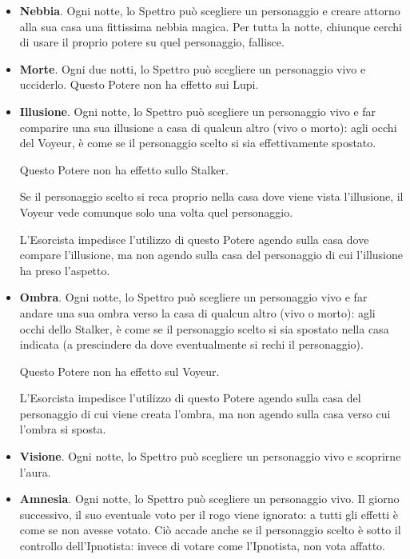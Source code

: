 \documentclass[a4paper,10pt]{article}
\begin{document}
\begin{itemize}
 \item {\bf Nebbia}. Ogni notte, lo Spettro può scegliere un personaggio e creare attorno alla sua casa una fittissima nebbia magica. Per tutta la notte, chiunque cerchi di usare il proprio potere su quel personaggio, fallisce.
 
 \item {\bf Morte}. Ogni due notti, lo Spettro può scegliere un personaggio vivo e ucciderlo. Questo Potere non ha effetto sui Lupi.
 
 \item {\bf Illusione}. Ogni notte, lo Spettro può scegliere un personaggio vivo e far comparire una sua illusione a casa di qualcun altro (vivo o morto): agli occhi del Voyeur, è come se il personaggio scelto si sia effettivamente spostato.
 
 Questo Potere non ha effetto sullo Stalker.

 Se il personaggio scelto si reca proprio nella casa dove viene vista l'illusione, il Voyeur vede comunque solo una volta quel personaggio.
 
 L'Esorcista impedisce l'utilizzo di questo Potere agendo sulla casa dove compare l'illusione, ma non agendo sulla casa del personaggio di cui l'illusione ha preso l'aspetto.

 \item {\bf Ombra}. Ogni notte, lo Spettro può scegliere un personaggio vivo e far andare una sua ombra verso la casa di qualcun altro (vivo o morto): agli occhi dello Stalker, è come se il personaggio scelto si sia spostato nella casa indicata (a prescindere da dove eventualmente si rechi il personaggio).
 
 Questo Potere non ha effetto sul Voyeur.
 
 L'Esorcista impedisce l'utilizzo di questo Potere agendo sulla casa del personaggio di cui viene creata l'ombra, ma non agendo sulla casa verso cui l'ombra si sposta.
 
 \item {\bf Visione}. Ogni notte, lo Spettro può scegliere un personaggio vivo e scoprirne l'aura.
 
 \item {\bf Amnesia}. Ogni notte, lo Spettro può scegliere un personaggio vivo. Il giorno successivo, il suo eventuale voto per il rogo viene ignorato: a tutti gli effetti è come se non avesse votato. Ciò accade anche se il personaggio scelto è sotto il controllo dell'Ipnotista: invece di votare come l'Ipnotista, non vota affatto.
 

\end{itemize}
\end{document}
